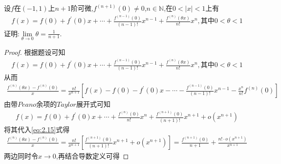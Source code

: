 \documentclass[lang=cn,newtx,10pt,scheme=chinese]{../Template/elegantbook}
\begin{document}
\begin{exercise}
    设\(f\)在\((-1,1)\)上\(n + 1\)阶可微,\(f^{(n + 1)}(0)\neq0\),\(n\in\mathbb{N}\),在\(0<|x|<1\)上有
    \begin{gather}
        f\left( x \right) =f\left( 0 \right) +f^{\prime}\left( 0 \right) x+\cdots +\frac{f^{\left( n-1 \right)}\left( 0 \right)}{\left( n-1 \right) !}x^{n-1}+\frac{f^{\left( n \right)}\left( \theta x \right)}{n!}x^n,\text{其中}0<\theta <1
        \nonumber
    \end{gather}
    证明:$\lim\limits_{\theta\to0}\theta=\frac{1}{n + 1}$.
\end{exercise}
    \begin{proof}
        根据题设可知
        \begin{gather}
            f\left( x \right) =f\left( 0 \right) +f^{\prime}\left( 0 \right) x+\cdots +\frac{f^{\left( n-1 \right)}\left( 0 \right)}{\left( n-1 \right) !}x^{n-1}+\frac{f^{\left( n \right)}\left( \theta x \right)}{n!}x^n,\text{其中}0<\theta <1
            \nonumber
        \end{gather}
        从而
        \begin{gather}\label{eq:2.15}
            \frac{f^{\left( n \right)}\left( \theta x \right) -f^{\left( n \right)}\left( 0 \right)}{x}=\frac{n!}{x^{n+1}}\left[ f\left( x \right) -f\left( 0 \right) -f^{\prime}\left( 0 \right) x-\cdots -\frac{f^{\left( n-1 \right)}\left( 0 \right)}{\left( n-1 \right) !}x^{n-1}-\frac{x^n}{n!}f^{\left( n \right)}\left( 0 \right) \right] 
        \end{gather}
        由带$Peano$余项的$Taylor$展开式可知
        \begin{gather}
            f\left( x \right) =f\left( 0 \right) +f^{\prime}\left( 0 \right) x+\cdots +\frac{f^{\left( n \right)}\left( 0 \right)}{n!}x^n+\frac{f^{\left( n+1 \right)}\left( 0 \right)}{\left( n+1 \right) !}x^{n+1}+o\left( x^{n+1} \right) 
            \nonumber
        \end{gather}
        将其代入\eqref{eq:2.15}式得
        \begin{gather}
            \frac{f^{\left( n \right)}\left( \theta x \right) -f^{\left( n \right)}\left( 0 \right)}{x}=\frac{n!}{x^{n+1}}\left[ \frac{f^{\left( n+1 \right)}\left( 0 \right)}{\left( n+1 \right) !}x^{n+1}+o\left( x^{n+1} \right) \right] =\frac{f^{\left( n+1 \right)}\left( 0 \right)}{n+1}+\frac{n!\cdot o\left( x^{n+1} \right)}{x^{n+1}}
            \nonumber
        \end{gather}
        两边同时令$x\to0$,再结合导数定义可得

\end{proof}
\end{document}
